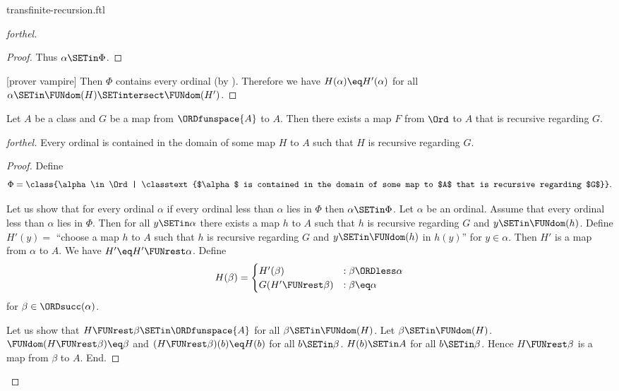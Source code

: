 \documentclass{stex}
\begin{document}
\begin{smodule}{transfinite-recursion.ftl}
\begin{proof}[forthel]
\begin{proof}
    Thus $\alpha \SETin \Phi$.
  \end{proof}

  [prover vampire]
  Then $\Phi$ contains every ordinal (by ).
  Therefore we have $H(\alpha) \eq H'(\alpha)$ for all $\alpha \SETin \FUNdom(H) \SETintersect \FUNdom(H')$.
\end{proof}

\begin{theorem}[forthel,title=Transfinite Recursion Theorem: Existence,id=transfinite_recursion_existence]
  Let $A$ be a class and $G$ be a map from $\ORDfunspace{A}$ to $A$.
  Then there exists a map $F$ from $\Ord$ to $A$ that is recursive regarding $G$.
\end{theorem}
\begin{proof}[forthel]
  Every ordinal is contained in the domain of some map $H$ to $A$ such that $H$ is recursive regarding $G$.
  \begin{proof}
    Define \[ \Phi = \class{\alpha \in \Ord | \classtext{$\alpha$ is contained in the domain of some map to $A$ that is recursive regarding $G$}}. \]

    Let us show that for every ordinal $\alpha$ if every ordinal less than $\alpha$ lies in $\Phi$ then $\alpha \SETin \Phi$.
      Let $\alpha$ be an ordinal.
      Assume that every ordinal less than $\alpha$ lies in $\Phi$.
      Then for all $y \SETin \alpha$ there exists a map $h$ to $A$ such that $h$ is recursive regarding $G$ and $y \SETin \FUNdom(h)$.
      Define $H'(y) =$ ``choose a map $h$ to $A$ such that $h$ is recursive regarding $G$ and $y \SETin \FUNdom(h)$ in $h(y)$'' for $y \in \alpha$.
      Then $H'$ is a map from $\alpha$ to $A$.
      We have $H' \eq H' \FUNrest \alpha$.
      Define \[ H(\beta) =
        \begin{cases}
          H'(\beta)                 & : \beta \ORDless \alpha \\
          G(H' \FUNrest \beta)  & : \beta \eq \alpha
        \end{cases} \]
      for $\beta \in \ORDsucc(\alpha)$.
      
      Let us show that $H \FUNrest \beta \SETin \ORDfunspace{A}$ for all $\beta \SETin \FUNdom(H)$.
        Let $\beta \SETin \FUNdom(H)$.
        $\FUNdom(H \FUNrest \beta) \eq \beta$ and $(H \FUNrest \beta)(b) \eq H(b)$ for all $b \SETin \beta$.
        $H(b) \SETin A$ for all $b \SETin \beta$.
        Hence $H \FUNrest \beta$ is a map from $\beta$ to $A$.
      End.


\end{proof}
\end{proof}
\end{smodule}
\end{document}
